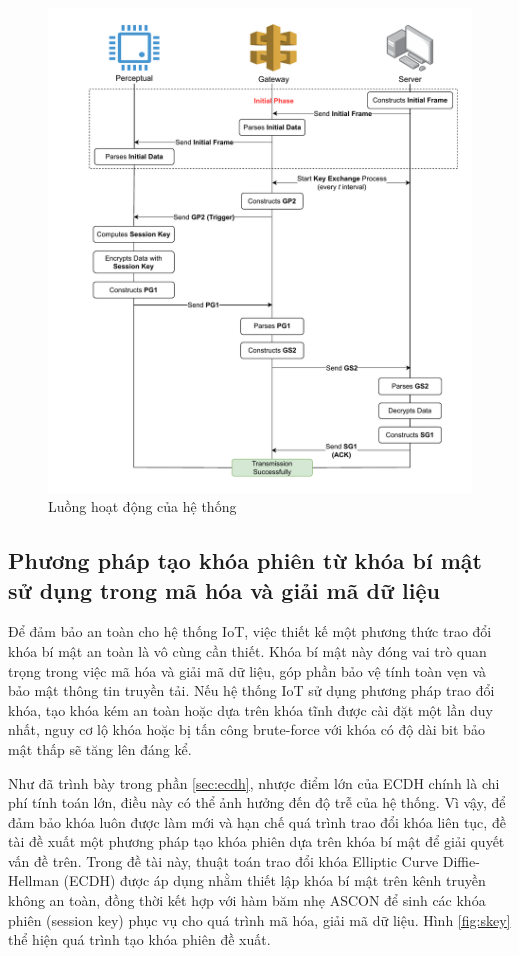 \begin{figure}[htbp]
    \centering
    \hspace*{-1cm}
    \includegraphics[width=1.1\linewidth]{trans-sys.pdf}
    \caption{Luồng hoạt động của hệ thống}
    \label{fig:trans-sys}
\end{figure}

\subsection{Phương pháp tạo khóa phiên từ khóa bí mật sử dụng trong mã hóa và giải mã dữ liệu}
\label{sec:key}
Để đảm bảo an toàn cho hệ thống IoT, việc thiết kế một phương thức trao đổi khóa bí mật an toàn là vô cùng cần thiết. Khóa bí mật này đóng vai trò quan trọng trong việc mã hóa và giải mã dữ liệu, góp phần bảo vệ tính toàn vẹn và bảo mật thông tin truyền tải. Nếu hệ thống IoT sử dụng phương pháp trao đổi khóa, tạo khóa kém an toàn hoặc dựa trên khóa tĩnh được cài đặt một lần duy nhất, nguy cơ lộ khóa hoặc bị tấn công brute-force với khóa có độ dài bit bảo mật thấp sẽ tăng lên đáng kể. 

Như đã trình bày trong phần \ref{sec:ecdh}, nhược điểm lớn của ECDH chính là chi phí tính toán lớn, điều này có thể ảnh hưởng đến độ trễ của hệ thống. Vì vậy, để đảm bảo khóa luôn được làm mới và hạn chế quá trình trao đổi khóa liên tục, đề tài đề xuất một phương pháp tạo khóa phiên dựa trên khóa bí mật để giải quyết vấn đề trên. Trong đề tài này, thuật toán trao đổi khóa Elliptic Curve Diffie-Hellman (ECDH) được áp dụng nhằm thiết lập khóa bí mật trên kênh truyền không an toàn, đồng thời kết hợp với hàm băm nhẹ ASCON để sinh các khóa phiên (session key) phục vụ cho quá trình mã hóa, giải mã dữ liệu. Hình \ref{fig:skey} thể hiện quá trình tạo khóa phiên đề xuất.

